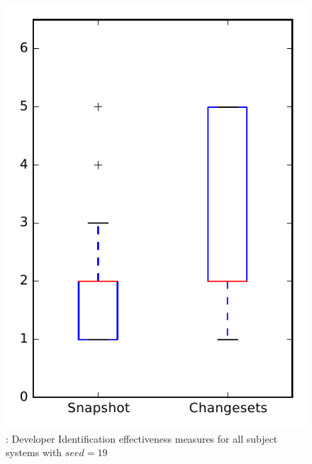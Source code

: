 
\begin{figure}
\centering
\includegraphics[height=0.4\textheight]{figures/dit_seed/rq1_overview_19}
\caption{\rtwo: Developer Identification effectiveness measures for all subject systems with $seed=19$}
\label{fig:dit_seed:rq1:overview}
\end{figure}
